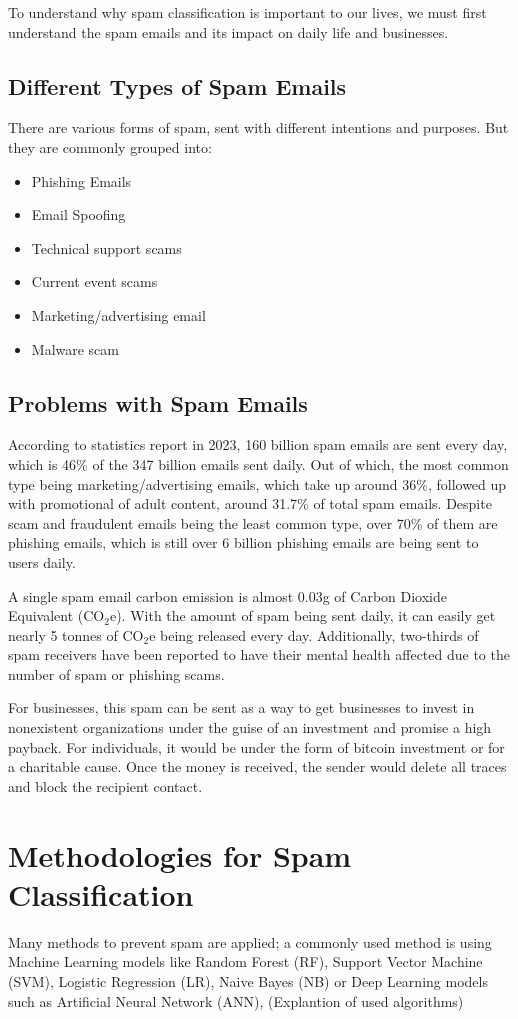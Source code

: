To understand why spam classification is important to our lives, we must first understand the spam emails and its impact on daily life and businesses.
\subsection{Different Types of Spam Emails}
\label{subsec:different-types-of-spam-emails}

There are various forms of spam, sent with different intentions and purposes.
But they are commonly grouped into:

\begin{itemize}
    \item Phishing Emails
    \item Email Spoofing
    \item Technical support scams
    \item Current event scams
    \item Marketing/advertising email
    \item Malware scam
\end{itemize}

\subsection{Problems with Spam Emails}
\label{subsec:problems-with-spam-emails}

According to statistics report in 2023, 160 billion spam emails are sent every day, which is 46\% of the 347 billion emails sent daily.
Out of which, the most common type being marketing/advertising emails, which take up around 36\%, followed up with promotional of adult content, around 31.7\% of total spam emails.
Despite scam and fraudulent emails being the least common type, over 70\% of them are phishing emails, which is still over 6 billion phishing emails are being sent to users daily.

A single spam email carbon emission is almost 0.03g of Carbon Dioxide Equivalent (CO$_{2}$e).
With the amount of spam being sent daily, it can easily get nearly 5 tonnes of CO$_{2}$e being released every day.
Additionally, two-thirds of spam receivers have been reported to have their mental health affected due to the number of spam or phishing scams.

For businesses, this spam can be sent as a way to get businesses to invest in nonexistent organizations under the guise of an investment and promise a high payback.
For individuals, it would be under the form of bitcoin investment or for a charitable cause.
Once the money is received, the sender would delete all traces and block the recipient contact.

\section{Methodologies for Spam Classification}
\label{sec:methodologies-for-spam-classification}

Many methods to prevent spam are applied; a commonly used method is using Machine Learning models like Random Forest (RF), Support Vector Machine (SVM), Logistic Regression (LR), Naive Bayes (NB) or Deep Learning models such as Artificial Neural Network (ANN),
(Explantion of used algorithms)
